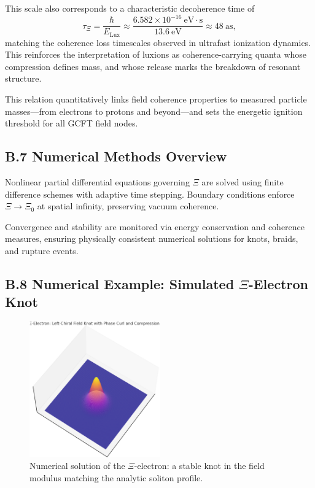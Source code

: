 This scale also corresponds to a characteristic decoherence time of
\[
\tau_\Xi = \frac{\hbar}{E_{\text{Lux}}} \approx \frac{6.582 \times 10^{-16}~\mathrm{eV \cdot s}}{13.6~\mathrm{eV}} \approx 48~\mathrm{as},
\]
matching the coherence loss timescales observed in ultrafast ionization dynamics. This reinforces the interpretation of luxions as coherence-carrying quanta whose compression defines mass, and whose release marks the breakdown of resonant structure.

This relation quantitatively links field coherence properties to measured particle masses—from electrons to protons and beyond—and sets the energetic ignition threshold for all GCFT field nodes.

\subsection*{B.7 Numerical Methods Overview}

Nonlinear partial differential equations governing $\Xi$ are solved using finite difference schemes with adaptive time stepping. Boundary conditions enforce $\Xi \to \Xi_0$ at spatial infinity, preserving vacuum coherence.

Convergence and stability are monitored via energy conservation and coherence measures, ensuring physically consistent numerical solutions for knots, braids, and rupture events.

\subsection*{B.8 Numerical Example: Simulated $\Xi$-Electron Knot}

\begin{figure}[H]
\centering
\includegraphics[width=0.5\textwidth]{figures/xi_electron_modulus_surface.png}
\caption{Numerical solution of the $\Xi$-electron: a stable knot in the field modulus matching the analytic soliton profile.}
\end{figure}

